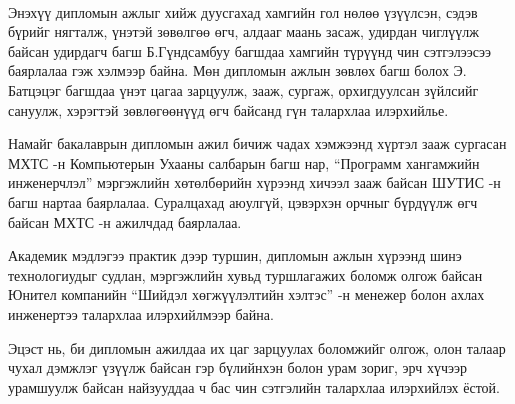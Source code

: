 
\begin{acknowledgements}
\addchaptertocentry{\acknowledgementname}

\paragraph{} Энэхүү дипломын ажлыг хийж дуусгахад хамгийн гол нөлөө үзүүлсэн, сэдэв бүрийг нягталж,  үнэтэй зөвөлгөө өгч,  алдааг маань засаж, удирдан чиглүүлж байсан удирдагч багш Б.Гүндсамбуу багшдаа хамгийн түрүүнд чин сэтгэлээсээ баярлалаа гэж хэлмээр байна. Мөн дипломын ажлын зөвлөх багш болох Э. Батцэцэг багшдаа үнэт цагаа зарцуулж, зааж, сургаж, орхигдуулсан зүйлсийг сануулж, хэрэгтэй зөвлөгөөнүүд өгч байсанд гүн талархлаа илэрхийлье.
\newline
\newline
\par Намайг бакалаврын дипломын ажил бичиж чадах хэмжээнд хүртэл зааж сургасан МХТС -н Компьютерын Ухааны салбарын багш нар, “Программ хангамжийн инженерчлэл” мэргэжлийн хөтөлбөрийн хүрээнд хичээл зааж байсан ШУТИС -н багш нартаа баярлалаа. Суралцахад аюулгүй, цэвэрхэн орчныг бүрдүүлж өгч байсан МХТС -н ажилчдад баярлалаа.
\newline
\newline
\par Академик мэдлэгээ практик дээр туршин, дипломын ажлын хүрээнд шинэ технологиудыг судлан, мэргэжлийн хувьд туршлагажих боломж олгож байсан Юнител компанийн “Шийдэл хөгжүүлэлтийн хэлтэс” -н менежер болон ахлах инженертээ талархлаа илэрхийлмээр байна.
\newline
\newline
\par Эцэст нь, би дипломын ажилдаа их цаг зарцуулах боломжийг олгож, олон талаар чухал дэмжлэг үзүүлж байсан гэр бүлийнхэн болон урам зориг, эрч хүчээр урамшуулж байсан найзууддаа ч бас чин сэтгэлийн талархлаа илэрхийлэх ёстой.


\end{acknowledgements}